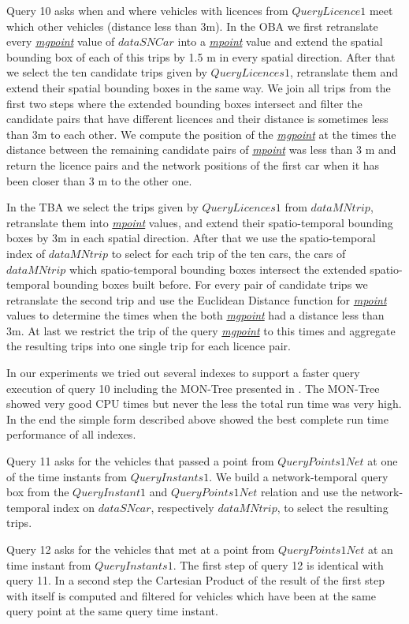 \documentclass[a4paper]{article}
\newcommand{\dt}[1]{\textsl{\underline{#1}}}
\begin{document}
{Query 10 asks when and where vehicles with licences from $QueryLicence1$ meet which
other vehicles (distance less than 3m). In the OBA we first retranslate every
\dt{mgpoint} value of $dataSNCar$ into a \dt{mpoint} value and extend the spatial
bounding box of each of this trips by 1.5 m in every spatial direction. After that we
select the ten candidate trips given by $QueryLicences1$, retranslate them and
extend their spatial bounding boxes in the same way. We join all trips from the
first two steps where the extended bounding boxes intersect and filter the
candidate pairs that have different licences and their distance is sometimes
less than 3m to each other. We compute the position of the \dt{mgpoint} at the
times the distance between the remaining candidate pairs of \dt{mpoint} was less
than 3 m and return the licence pairs and the network positions of the first car
when it has been closer than 3 m to the other one.

In the TBA we select the trips given by $QueryLicences1$ from
$dataMNtrip$, retranslate them into \dt{mpoint} values, and extend their spatio-temporal
bounding boxes by 3m in each spatial direction. After that we use the spatio-temporal
index of $dataMNtrip$ to select for each trip of the ten cars, the cars
of $dataMNtrip$ which spatio-temporal bounding boxes intersect the extended spatio-temporal
bounding boxes built before. For every pair of candidate trips we
retranslate the second trip and use the Euclidean Distance function for \dt{mpoint}
values to determine the times when the both \dt{mgpoint} had a distance less than 3m.
At last we restrict the trip of the query \dt{mgpoint} to this times and
aggregate the resulting trips into one single trip for each licence pair.

In our experiments we tried out several indexes to support a faster query execution
of query 10 including the MON-Tree presented in \cite{MONTreeAlmeidaGeoinformatica}. The MON-Tree showed
very good CPU times but never the less the total run time was very high. In the end
the simple form described above showed the best complete run time performance of all
indexes.

Query 11 asks for the vehicles that passed a point from $QueryPoints1Net$ at one of the
time instants from $QueryInstants1$. We build a network-temporal query box from the
$QueryInstant1$ and $QueryPoints1Net$ relation and use the network-temporal index
on $dataSNcar$, respectively $dataMNtrip$, to select the resulting trips.

Query 12 asks for the vehicles that met at a point from $QueryPoints1Net$ at an time
instant from $QueryInstants1$. The first step of query 12 is identical with query 11.
In a second step the Cartesian Product of the result of the first step with itself
is computed and filtered for vehicles which have been at the same query point
at the same query time instant.

}
\end{document}

